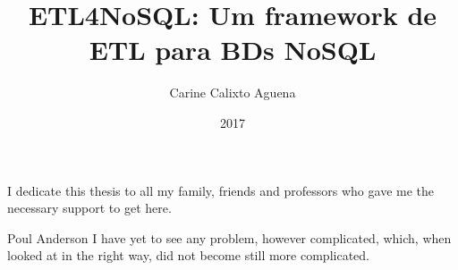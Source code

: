 \documentclass[pt,twoside,onehalfspacing,phd]{risethesis}
\title{ETL4NoSQL: Um framework de ETL para BDs NoSQL}
\date{2017}
\author{Carine Calixto Aguena}
\begin{document}
\frontmatter

\frontpage

\presentationpage

\begin{fichacatalografica}
	\FakeFichaCatalografica %
\end{fichacatalografica}

\banca

\begin{dedicatory}
I dedicate this thesis to all my family, friends and professors who gave me the
necessary support to get here.
\end{dedicatory}

\acknowledgements


\begin{epigraph}[]{Poul Anderson}
I have yet to see any problem, however complicated, which, when looked at in the
right way, did not become still more complicated.
\end{epigraph}

\resumo
{\parindent0pt
	
}

\abstract
{\parindent0pt
	
}

\listoffigures

\listoftables

\listofacronyms


\tableofcontents

\mainmatter



%





\begin{references}
  
\end{references}


\theappendix
%
\end{document}
